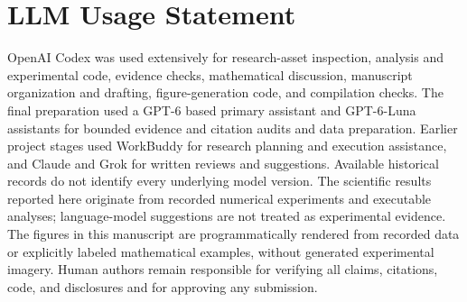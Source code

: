 \documentclass[10pt,twocolumn,letterpaper]{article}
\begin{document}
\clearpage
\section*{LLM Usage Statement}
OpenAI Codex was used extensively for research-asset inspection, analysis and experimental code, evidence checks, mathematical discussion, manuscript organization and drafting, figure-generation code, and compilation checks. The final preparation used a GPT-6 based primary assistant and GPT-6-Luna assistants for bounded evidence and citation audits and data preparation. Earlier project stages used WorkBuddy for research planning and execution assistance, and Claude and Grok for written reviews and suggestions. Available historical records do not identify every underlying model version. The scientific results reported here originate from recorded numerical experiments and executable analyses; language-model suggestions are not treated as experimental evidence. The figures in this manuscript are programmatically rendered from recorded data or explicitly labeled mathematical examples, without generated experimental imagery. Human authors remain responsible for verifying all claims, citations, code, and disclosures and for approving any submission.

{\small

}
\end{document}
